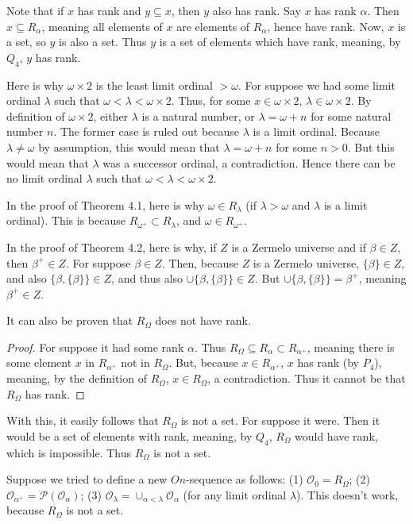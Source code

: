 \documentclass{article}
\theoremstyle{definition}
\begin{document}
Note that if $x$ has rank and $y\subseteq x$, then $y$ also has rank. Say $x$ has rank $\alpha$. Then $x\subseteq R_\alpha$, meaning 
all elements of $x$ are elements of $R_\alpha$, hence have rank. Now, $x$ is a set, so $y$ is also a set. Thus $y$ is a set of elements which 
have rank, meaning, by $Q_4$, $y$ has rank. 
 
Here is why $\omega\times 2$ is the least limit ordinal $>\omega$. For suppose we had some limit ordinal $\lambda$ such that 
$\omega<\lambda<\omega\times 2$. Thus, for some $x\in\omega\times 2$, $\lambda\in\omega\times 2$. By definition of 
$\omega\times 2$, either $\lambda$ is a natural number, or $\lambda=\omega+n$ for some natural number $n$. The former case is ruled out because 
$\lambda$ is a limit ordinal. Because $\lambda\ne\omega$ by assumption, this would mean that $\lambda=\omega+n$ for some $n>0$. But this would mean that 
$\lambda$ was a successor ordinal, a contradiction. Hence there can be no limit ordinal $\lambda$ such that $\omega<\lambda<\omega\times 2$.

In the proof of Theorem 4.1, here is why $\omega\in R_\lambda$ (if $\lambda>\omega$ and $\lambda$ is a limit ordinal). This is because $R_{\omega^+}\subset R_\lambda$, and 
$\omega\in R_{\omega^+}$.

In the proof of Theorem 4.2, here is why, if $Z$ is a Zermelo universe and if $\beta\in Z$, then $\beta^+\in Z$. For suppose $\beta\in Z$. Then, because $Z$ is a Zermelo universe, 
$\{\beta\}\in Z$, and also $\{\beta,\{\beta\}\}\in Z$, and thus also $\cup\{\beta,\{\beta\}\}\in Z$. But 
$\cup\{\beta,\{\beta\}\}=\beta^+$, meaning $\beta^+\in Z$.

It can also be proven that $R_\Omega$ does not have rank.
\begin{proof}
For suppose it had some rank $\alpha$. Thus $R_\Omega\subseteq R_\alpha\subset R_{\alpha^+}$, meaning there is some element $x$ in 
$R_{\alpha^+}$ not in $R_\Omega$. But, because $x\in R_{\alpha^+}$, $x$ has rank (by $P_4$), meaning, by the definition of 
$R_\Omega$, $x\in R_\Omega$, a contradiction. Thus it cannot be that $R_\Omega$ has rank.
\end{proof}

With this, it easily follows that $R_\Omega$ is not a set. For suppose it were. Then it would be a set of elements with rank, meaning, by $Q_4$, $R_\Omega$ would have 
rank, which is impossible. Thus $R_\Omega$ is not a set.

Suppose we tried to define a new $On$-sequence as follows:\newline
(1) $\mathcal{O}_0=R_\Omega$;\newline
(2) $\mathcal{O}_{\alpha^+}=\mathcal{P}(\mathcal{O}_\alpha)$;\newline
(3) $\mathcal{O}_\lambda=\cup_{\alpha<\lambda}\mathcal{O}_\alpha$ (for any limit ordinal $\lambda$).\newline
This doesn't work, because $R_\Omega$ is not a set.
\end{document}
